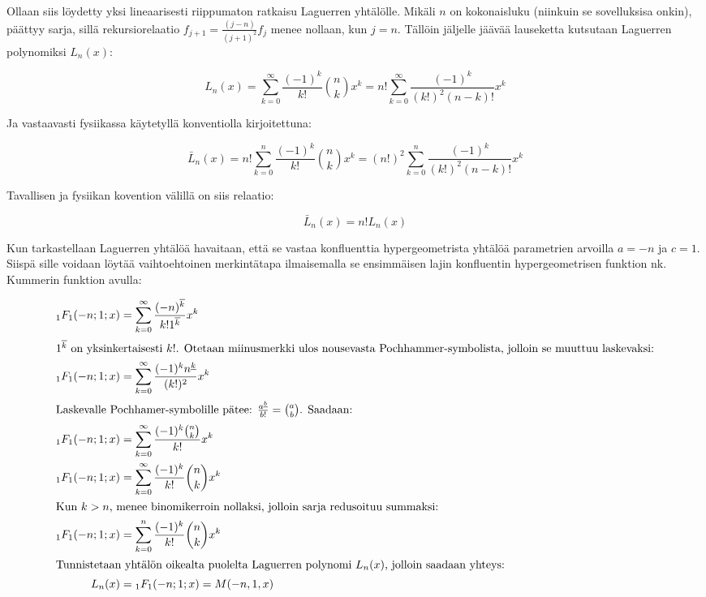 \documentclass[../johdoksia.tex]{subfiles}
\begin{document}
	Ollaan siis löydetty yksi lineaarisesti riippumaton ratkaisu Laguerren yhtälölle. Mikäli $n$ on kokonaisluku (niinkuin se sovelluksisa onkin), päättyy sarja, sillä rekursiorelaatio $f_{j + 1} = \frac{(j - n)}{(j + 1)^2}f_j$ menee nollaan, kun $j = n$. Tällöin jäljelle jäävää lauseketta kutsutaan Laguerren polynomiksi $L_n(x)$:
	
	\begin{equation}
		\boxed{L_n(x) = \sum_{k = 0}^{\infty}\frac{(-1)^k}{k!}\binom{n}{k}x^{k} = n!\sum_{k = 0}^{\infty}\frac{(-1)^k}{(k!)^2(n - k)!}x^{k}}
	\end{equation}
	
	Ja vastaavasti fysiikassa käytetyllä konventiolla kirjoitettuna:
	
	\begin{equation}
		\boxed{\bar{L}_n(x) = n!\sum_{k = 0}^{n}\frac{(-1)^k}{k!}\binom{n}{k}x^{k} = (n!)^2\sum_{k = 0}^{n}\frac{(-1)^k}{(k!)^2(n - k)!}x^k}
	\end{equation}

	Tavallisen ja fysiikan kovention välillä on siis relaatio:
	
	\begin{equation}
		\boxed{\bar{L}_n(x) = n!L_n(x)}
	\end{equation}

	Kun tarkastellaan Laguerren yhtälöä havaitaan, että se vastaa konfluenttia hypergeometrista yhtälöä parametrien arvoilla $a = -n$ ja $c = 1$. Siispä sille voidaan löytää vaihtoehtoinen merkintätapa ilmaisemalla se ensimmäisen lajin konfluentin hypergeometrisen funktion nk. Kummerin funktion avulla:
	
	\begin{align*}
		{_1{F}_1}(-n; 1; x) &= \sum_{k = 0}^{\infty}\frac{(-n)^{\overline{k}}}{k!1^{\overline{k}}}x^k \\
		\intertext{$1^{\overline{k}}$ on yksinkertaisesti $k!$. Otetaan miinusmerkki ulos nousevasta Pochhammer-symbolista, jolloin se muuttuu laskevaksi:}
		{_1{F}_1}(-n; 1; x) &= \sum_{k = 0}^{\infty}\frac{(-1)^kn^{\underline{k}}}{(k!)^2}x^k \\
		\intertext{Laskevalle Pochhamer-symbolille pätee: $\frac{a^{\underline{b}}}{b!} = \binom{a}{b}$. Saadaan:}
		{_1{F}_1}(-n; 1; x) &= \sum_{k = 0}^{\infty}\frac{(-1)^k\binom{n}{k}}{k!}x^k \\
		{_1{F}_1}(-n; 1; x) &= \sum_{k = 0}^{\infty}\frac{(-1)^k}{k!}\binom{n}{k}x^k \\
		\intertext{Kun $k > n$, menee binomikerroin nollaksi, jolloin sarja redusoituu summaksi:}
		{_1{F}_1}(-n; 1; x) &= \sum_{k = 0}^{n}\frac{(-1)^k}{k!}\binom{n}{k}x^k \\
		\intertext{Tunnistetaan yhtälön oikealta puolelta Laguerren polynomi $L_n(x)$, jolloin saadaan yhteys:}
		L_n(x) &= {_1{F}_1}(-n; 1; x) = M(-n, 1, x)
	\end{align*}
\end{document}
